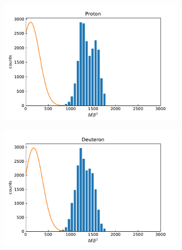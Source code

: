 \begin{figure}[ht]
	\centering
	\begin{subfigure}[c]{0.45\textwidth}		
		\centering	
		\includegraphics[width=\textwidth]{dat/debeta_Proton.pdf}
	\end{subfigure}
	\begin{subfigure}[c]{0.45\textwidth}
		\centering
		\includegraphics[width=\textwidth]{dat/debeta_Deuteron.pdf}
	\end{subfigure}
	

\end{figure}
